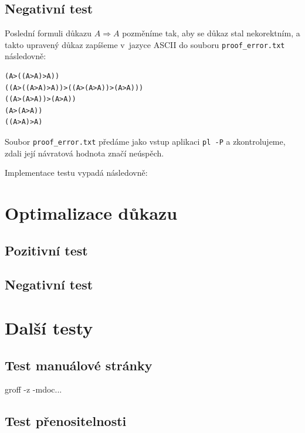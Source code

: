 \documentclass[thesis=B,czech,hidelinks]{thesis}[2012/06/26]
\begin{document}
\subsection{Negativní test}

Poslední formuli důkazu $A \Rightarrow A$ pozměníme tak, aby se důkaz stal nekorektním, a takto upravený důkaz zapíšeme v~jazyce ASCII do souboru \texttt{proof\_error.txt} následovně:

\begin{verbatim}
(A>((A>A)>A))
((A>((A>A)>A))>((A>(A>A))>(A>A)))
((A>(A>A))>(A>A))
(A>(A>A))
((A>A)>A)
\end{verbatim}

Soubor \texttt{proof\_error.txt} předáme jako vstup aplikaci \texttt{pl -P} a zkontrolujeme, zdali její návratová hodnota značí neúspěch.

Implementace testu vypadá následovně:

\begin{center}

\end{center}

\section{Optimalizace důkazu}

\subsection{Pozitivní test}

\subsection{Negativní test}

\section{Další testy}

\subsection{Test manuálové stránky}

groff -z -mdoc...

\subsection{Test přenositelnosti}
\end{document}
